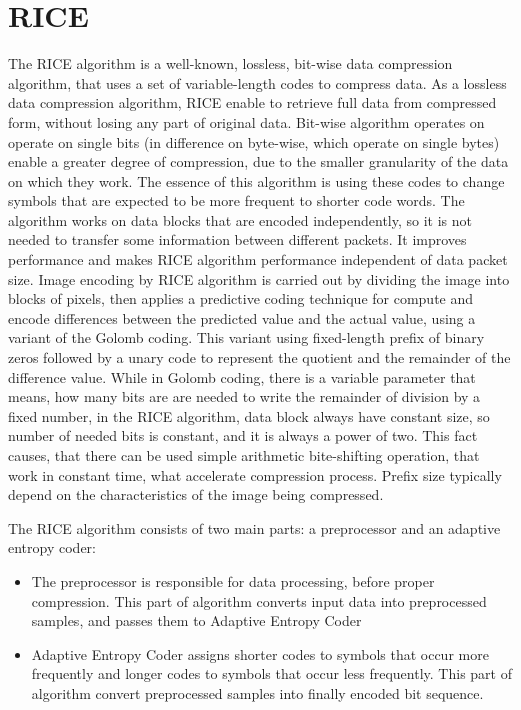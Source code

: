 \documentclass[licencjacka,en]{pracamgr}
\begin{document}
\section{RICE}
The RICE algorithm is a well-known, lossless, bit-wise data compression algorithm, that uses a set of variable-length codes to compress data. As a lossless data compression algorithm, RICE enable to retrieve full data from compressed form, without losing any part of original data. Bit-wise algorithm operates on operate on single bits (in difference on byte-wise, which operate on single bytes) enable a greater degree of compression, due to the smaller granularity of the data on which they work. The essence of this algorithm is using these codes to change symbols that are expected to be more frequent to shorter code words. The algorithm works on data blocks that are encoded independently, so it is not needed to transfer some information between different packets. It improves performance and makes RICE algorithm performance independent of data packet size. Image encoding by RICE algorithm is carried out by dividing the image into blocks of pixels, then applies a predictive coding technique for compute and encode differences between the predicted value and the actual value, using a variant of the Golomb coding. This variant using fixed-length prefix of binary zeros followed by a unary code to represent the quotient and the remainder of the difference value. While in Golomb coding, there is a variable parameter that means, how many bits are are needed to write the remainder of division by a fixed number, in the RICE algorithm, data block always have constant size, so number of needed bits is constant, and it is always a power of two. This fact causes, that there can be used simple arithmetic bite-shifting operation, that work in constant time, what accelerate compression process.
Prefix size typically depend on the characteristics of the image being compressed. \hfill \break

The RICE algorithm consists of two main parts: a preprocessor and an adaptive entropy coder:
\begin{itemize}
	\item The preprocessor is responsible for data processing, before proper compression. This part of algorithm converts input data into preprocessed samples, and passes them to Adaptive Entropy Coder
	\item Adaptive Entropy Coder assigns shorter codes to symbols that occur more frequently and longer codes to symbols that occur less frequently. This part of algorithm convert preprocessed samples into finally encoded bit sequence.
\end{itemize}
\end{document}
